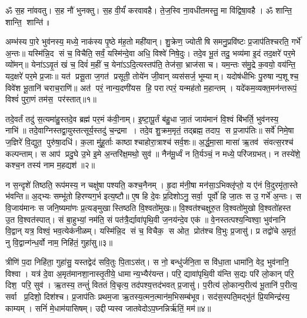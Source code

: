 \setcounter{anuvakam}{0}
ॐ स॒ह ना॑ववतु। 
स॒ह नौ॑ भुनक्तु। 
स॒ह वी॒र्यं॑ करवावहै। 
ते॒ज॒स्वि ना॒वधी॑तमस्तु॒ मा वि॑द्विषा॒वहै। 
ॐ शान्ति॒ शान्ति॒ शान्ति॑॥

अम्भ॑स्य पा॒रे भुव॑नस्य॒ मध्ये॒ नाक॑स्य पृ॒ष्ठे म॑ह॒तो मही॑यान्। 
शु॒क्रेण॒ ज्योतीषि समनु॒प्रवि॑ष्टः प्र॒जाप॑तिश्चरति॒ गर्भे॑ अ॒न्तः॥ 
यस्मि॑न्नि॒द सं च॒ विचैति॒ सर्वं॒ यस्मि॑न्दे॒वा अधि॒ विश्वे॑ निषे॒दुः। 
तदे॒व भू॒तं तदु॒ भव्य॑मा इ॒दं तद॒क्षरे॑ पर॒मे व्यो॑मन्॥ 
येना॑ऽऽवृ॒तं खं च॒ दिवं॑ म॒हीं च॒ येना॑ऽऽदि॒त्यस्तप॑ति॒ तेज॑सा॒ भ्राज॑सा च। 
यम॒न्तः स॑मु॒द्रे क॒वयो॒ वय॑न्ति॒ यद॒क्षरे॑ पर॒मे प्र॒जाः॥ 
यत॑ प्रसू॒ता ज॒गत॑ प्रसूती॒ तोये॑न जी॒वान् व्यस॑सर्ज॒ भूम्याम्। 
यदोष॑धीभिः पु॒रुषान्प॒शूश्च॒ विवे॑श भू॒तानि॑ चराच॒राणि॑॥ 
अत॑ परं॒ नान्य॒दणी॑यस हि॒ परात्परं॒ यन्मह॑तो म॒हान्तम्। 
यदे॑कम॒व्यक्त॒मन॑न्तरूपं॒ विश्वं॑ पुरा॒णं तम॑स॒ पर॑स्तात्॥१॥

तदे॒वर्तं तदु॑ स॒त्यमा॑हु॒स्तदे॒व ब्रह्म॑ पर॒मं क॑वी॒नाम्। 
इ॒ष्टा॒पू॒र्तं ब॑हु॒धा जा॒तं जाय॑मानं वि॒श्वं बि॑भर्ति॒ भुव॑नस्य॒ नाभि॑॥ 
तदे॒वाग्निस्तद्वा॒युस्तत्सूर्य॒स्तदु॑ च॒न्द्रमा। 
तदे॒व शु॒क्रम॒मृतं॒ तद्ब्रह्म॒ तदाप॒ स प्र॒जाप॑तिः॥ 
सर्वे॑ निमे॒षा ज॒ज्ञिरे॑ वि॒द्युत॒ पुरु॑षा॒दधि॑। 
क॒ला मु॑हू॒र्ताः काष्ठाश्चाहोरा॒त्राश्च॑ सर्व॒शः॥ 
अ॒र्द्ध॒मा॒सा मासा॑ ऋ॒तव॑ संवत्स॒रश्च॑ कल्पन्ताम्। 
स आप॑ प्रदु॒घे उ॒भे इ॒मे अ॒न्तरि॑क्ष॒मथो॒ सुव॑॥ 
नैन॑मू॒र्ध्वं न ति॒र्यञ्चं॒ न मध्ये॒ परि॑जग्रभत्। 
न तस्ये॑शे॒ कश्च॒न तस्य॑ नाम म॒हद्यश॑॥२॥

न स॒न्दृशे॑ तिष्ठति॒ रूप॑मस्य॒ न चक्षु॑षा पश्यति॒ कश्च॒नैनम्। 
हृ॒दा म॑नी॒षा मन॑सा॒ऽभिक्लृ॑प्तो॒ य ए॑नं वि॒दुरमृ॑ता॒स्ते भ॑वन्ति॥ 
अ॒द्भ्यः सम्भू॑तो हिरण्यग॒र्भ इत्य॒ष्टौ॥ 
ए॒ष हि दे॒वः प्र॒दिशोऽनु॒ सर्वा॒ पूर्वो॑ हि जा॒तः स उ॒ गर्भे॑ अ॒न्तः। 
स वि॒जाय॑मानः स जनि॒ष्यमा॑णः प्र॒त्यङ्मुखास्तिष्ठति वि॒श्वतो॑मुखः॥ 
वि॒श्वत॑श्चक्षुरु॒त वि॒श्वतो॑मुखो वि॒श्वतो॑हस्त उ॒त वि॒श्वत॑स्पात्। 
सं बा॒हुभ्यां॒ नम॑ति॒ सं पत॑त्रै॒र्द्यावा॑पृथि॒वी ज॒नय॑न्दे॒व एक॑॥ 
वे॒नस्तत्पश्य॒न्विश्वा॒ भुव॑नानि वि॒द्वान् यत्र॒ विश्वं॒ भव॒त्येक॑नीळम्। 
यस्मि॑न्नि॒द सं च॒ विचैक॒ स ओत॒ प्रोत॑श्च वि॒भुः प्र॒जासु॑। 
प्र तद्वो॑चे अ॒मृतं॒ नु वि॒द्वान्ग॑न्ध॒र्वो नाम॒ निहि॑तं॒ गुहा॑सु॥३॥

त्रीणि॑ प॒दा निहि॑ता॒ गुहा॑सु॒ यस्तद्वेद॑ सवि॒तुः पि॒ताऽस॑त्। 
स नो॒ बन्धु॑र्जनि॒ता स वि॑धा॒ता धामा॑नि॒ वेद॒ भुव॑नानि॒ विश्वा। 
यत्र॑ दे॒वा अ॒मृत॑मानशा॒नास्तृ॒तीये॒ धामान्य॒भ्यैर॑यन्त। 
परि॒ द्यावा॑पृथि॒वी य॑न्ति स॒द्यः परि॑ लो॒कान् परि॒ दिश॒ परि॒ सुव॑। 
ऋ॒तस्य॒ तन्तुं॑ विततं वि॒चृत्य॒ तद॑पश्य॒त्तद॑भवत् प्र॒जासु॑। 
प॒रीत्य॑ लो॒कान्प॒रीत्य॑ भू॒तानि॑ प॒रीत्य॒ सर्वा प्र॒दिशो॒ दिश॑श्च। 
प्र॒जाप॑तिः प्रथम॒जा ऋ॒तस्य॒\aav{}\aav{}त्मन॒\aav{}\aav{}त्मान॑म॒भिसम्ब॑भूव। 
सद॑स॒स्पति॒मद्भु॑तं प्रि॒यमिन्द्र॑स्य॒ काम्यम्। 
सनिं॑ मे॒धाम॑यासिषम्। 
उद्दीप्यस्व जातवेदोऽप॒घ्नन्निर्\mbox{}ऋ॑तिं॒ मम॑॥४॥

